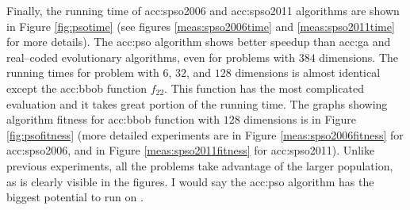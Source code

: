 Finally, the running time of \acrshort{acc:spso2006} and \acrshort{acc:spso2011} algorithms are shown in Figure \ref{fig:psotime} (see figures \ref{meas:spso2006time} and \ref{meas:spso2011time} for more details). The \acrshort{acc:pso} algorithm shows better speedup than \acrshort{acc:ga} and real--coded evolutionary algorithms, even for problems with $384$ dimensions. The running times for problem with $6$, $32$, and $128$ dimensions is almost identical except the \acrshort{acc:bbob} function $f_{22}$. This function has the most complicated evaluation and it takes great portion of the running time. The graphs showing algorithm fitness for \acrshort{acc:bbob} function with $128$ dimensions is in Figure \ref{fig:psofitness} (more detailed experiments are in Figure \ref{meas:spso2006fitness} for \acrshort{acc:spso2006}, and in Figure \ref{meas:spso2011fitness} for \acrshort{acc:spso2011}). Unlike previous experiments, all the problems take advantage of the larger population, as is clearly visible in the figures. I would say the \acrshort{acc:pso} algorithm has the biggest potential to run on \gpuns.

